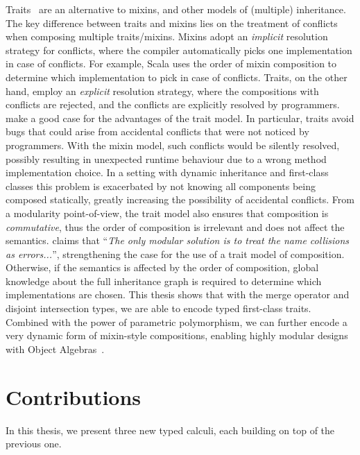 Traits~\citep{scharli2003traits, Ducasse_2006} are an alternative to mixins, and
other models of (multiple) inheritance. The key difference between traits and
mixins lies on the treatment of conflicts when composing multiple traits/mixins.
Mixins adopt an \emph{implicit} resolution strategy for conflicts, where the
compiler automatically picks one implementation in case of conflicts. For
example, Scala uses the order of mixin composition to determine which
implementation to pick in case of conflicts. Traits, on the other hand, employ
an \emph{explicit} resolution strategy, where the compositions with conflicts
are rejected, and the conflicts are explicitly resolved by programmers.
\citet{scharli2003traits} make a good case for the advantages of the trait
model. In particular, traits avoid bugs that could arise from accidental
conflicts that were not noticed by programmers. With the mixin model, such
conflicts would be silently resolved, possibly resulting in unexpected runtime
behaviour due to a wrong method implementation choice. In a setting with dynamic
inheritance and first-class classes this problem is exacerbated by not knowing
all components being composed statically, greatly increasing the possibility of
accidental conflicts. From a modularity point-of-view, the trait model also
ensures that composition is \emph{commutative}, thus the order of composition is
irrelevant and does not affect the semantics. \citet{bracha1992programming}
claims that ``\emph{The only modular solution is to treat the name collisions as
  errors...}'', strengthening the case for the use of a trait model of
composition. Otherwise, if the semantics is affected by the order of
composition, global knowledge about the full inheritance graph is required to
determine which implementations are chosen. %
This thesis shows that with the merge operator
and disjoint intersection types, we are able to encode typed first-class traits.
Combined with the power of parametric polymorphism, we can further encode a very
dynamic form of mixin-style compositions, enabling highly modular designs with
Object Algebras~\citep{oliveira2012extensibility}.


\section{Contributions}

In this thesis, we present three new typed calculi, each building on top of the previous one.

